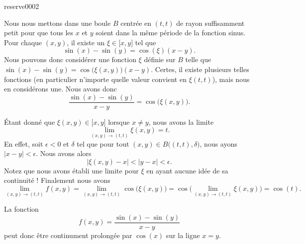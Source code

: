 

\begin{corrige}{reserve0002}

	Nous nous mettons dans une boule $B$ centrée en $(t,t)$ de rayon suffisamment petit pour que tous les $x$ et $y$ soient dans la même période de la fonction sinus. Pour chaque $(x,y)$, il existe un $\xi\in\mathopen[ x , y \mathclose]$ tel que
	\begin{equation}
		\sin(x)-\sin(y)=\cos(\xi)(x-y).
	\end{equation}
	Nous pouvons donc considérer une fonction $\xi$ définie sur $B$ telle que $\sin(x)-\sin(y)=\cos\big(\xi(x,y)\big)(x-y)$. Certes, il existe plusieurs telles fonctions (en particulier n'importe quelle valeur convient en $\xi(t,t)$), mais nous en considérons une. Nous avons donc
	\begin{equation}
		\frac{ \sin(x)-\sin(y) }{ x-y }=\cos\big( \xi(x,y) \big).
	\end{equation}
	
	Étant donné que $\xi(x,y)\in\mathopen[ x , y \mathclose]$ lorsque $x\neq y$, nous avons la limite
	\begin{equation}
		\lim_{(x,y)\to(t,t)}\xi(x,y)=t.
	\end{equation}
	En effet, soit $\epsilon<0$ et $\delta$ tel que pour tout $(x,y)\in B\big( (t,t),\delta \big)$, nous ayons $| x-y |<\epsilon$. Nous avons alors
	\begin{equation}
		\big| \xi(x,y)-x \big|<| y-x |<\epsilon.
	\end{equation}
	Notez que nous avons établi une limite pour $\xi$ en ayant aucune idée de sa continuité ! Finalement nous avons
	\begin{equation}
		\lim_{(x,y)\to(t,t)}f(x,y)=\lim_{(x,y)\to(t,t)}\cos\big( \xi(x,y) \big)=\cos\big( \lim_{(x,y)\to(t,t)}\xi(x,y) \big)=\cos(t).
	\end{equation}

	La fonction
	\begin{equation}
		f(x,y)=\frac{ \sin(x)-\sin(y) }{ x-y }
	\end{equation}
	peut donc être continument prolongée par $\cos(x)$ sur la ligne $x=y$.
	
\end{corrige}

